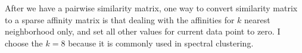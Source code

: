 After we have a pairwise similarity matrix, one way to convert similarity matrix to a sparse affinity matrix is that dealing with the affinities for $k$ nearest neighborhood only, and set all other values for current data point to zero. 
I choose the $k = 8$ because it is commonly used in spectral clustering. 

